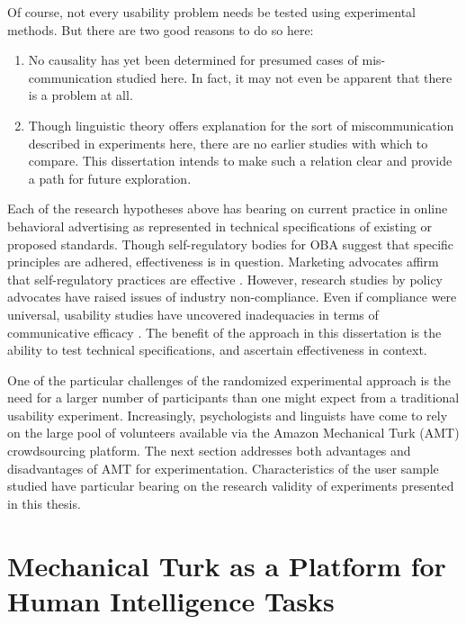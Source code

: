 Of course, not every usability problem needs be tested using experimental methods. But there are two good reasons to do so here:

\begin{sloppier}
\begin{enumerate}
\item No causality has yet been determined for presumed cases of mis-communication studied here. In fact, it may not even be apparent that there is a problem at all.
\item Though linguistic theory offers explanation for the sort of miscommunication described in experiments here, there are no earlier studies with which to compare. This dissertation intends to make such a relation clear and provide a path for future exploration. 
\end{enumerate}
\end{sloppier}

Each of the research hypotheses above has bearing on current practice in online behavioral advertising as represented in technical specifications of existing or proposed standards. Though self-regulatory bodies for OBA suggest that specific principles are adhered, effectiveness is in question. Marketing advocates affirm that self-regulatory practices are effective  \citep{AdChoicesOurExpe:2012ux}.  However, research studies by policy advocates  \citep[e.g.,][]{Komanduri:2012wo,Mayer:2012wt}  have raised issues of industry non-compliance. Even if compliance were universal, usability studies have uncovered inadequacies in terms of communicative efficacy  \citep{Leon:2012vu,Ur:2012ws,Hastak:2010vf}.  The benefit of the approach in this dissertation is the ability to test technical specifications, and ascertain effectiveness in context. 

One of the particular challenges of the randomized experimental approach is the need for a larger number of participants than one might expect from a traditional usability experiment. Increasingly, psychologists and linguists have come to rely on the large pool of volunteers available via the Amazon Mechanical Turk (AMT) crowdsourcing platform. The next section addresses both advantages and disadvantages of AMT for experimentation. Characteristics of the user sample studied have particular bearing on the research validity of experiments presented in this thesis.


\section[Mechanical Turk]{Mechanical Turk as a Platform for Human Intelligence Tasks}
\label{mechanicalturkasaplatformforhumanintelligencetasks}


